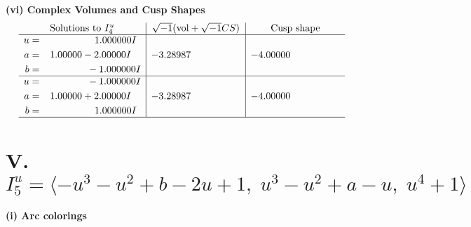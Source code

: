 \documentclass[1p]{elsarticle_modified}
\theoremstyle{definition}
\newcommand{\I}{\sqrt{-1}}
\begin{document}
\newpage\flushleft \textbf{(vi) Complex Volumes and Cusp Shapes}
$$\begin{array}{c|c|c}  
\text{Solutions to }I^u_{4}& \I (\text{vol} + \sqrt{-1}CS) & \text{Cusp shape}\\
 \hline 
\begin{aligned}
u &= \phantom{-0.000000 -}1.000000 I \\
a &= \phantom{-}1.00000 - 2.00000 I \\
b &= \phantom{-0.000000 } -1.000000 I\end{aligned}
 & -3.28987\phantom{ +0.000000I} & -4.00000\phantom{ +0.000000I} \\ \hline\begin{aligned}
u &= \phantom{-0.000000 } -1.000000 I \\
a &= \phantom{-}1.00000 + 2.00000 I \\
b &= \phantom{-0.000000 -}1.000000 I\end{aligned}
 & -3.28987\phantom{ +0.000000I} & -4.00000\phantom{ +0.000000I}\\
 \hline 
 \end{array}$$\newpage\newpage\renewcommand{\arraystretch}{1}
\centering \section*{V. $I^u_{5}= \langle - u^3- u^2+b-2 u+1,\;u^3- u^2+a- u,\;u^4+1 \rangle$}
\flushleft \textbf{(i) Arc colorings}\\
\end{document}

